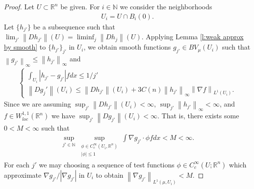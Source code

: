 \documentclass[12pt]{amsart}
\numberwithin{equation}{section}
\theoremstyle{plain}
\theoremstyle{definition}
\newcommand{\norm}[1]{\left\lVert#1\right\rVert}
\newcommand{\dist}{\mathop\mathrm{dist}\nolimits}
\begin{document}
\begin{proof}
    Let $U \subset \mathbb{R}^n$ be given.  For $i \in \mathbb{N}$ we consider the neighborhoods
    \begin{align*}
        U_i = U \cap B_i(0).
    \end{align*}
Let $\{h_{j'}\}$ be a subsequence such that $\lim_{j'}\norm{Dh_{j'}}(U) = \liminf_j \norm{Dh_j}(U)$.  Applying Lemma \ref{l:weak approx by smooth} to $\{h_{j'}\}_{j'}$ in $U_i$, we obtain smooth functions $g_{j'} \in BV_{\mu}(U_i)$ such that $\norm{g_{j'}}_{\infty} \le \norm{h_{j'}}_{\infty}$ and 
\begin{align}\label{e:smooth approx and strong convergence}
    \begin{cases}
\int_{U_i}|h_{j'} - g_{j'}|fdx \le 1/j'\\
\norm{Dg_j'}(U_i) \le \norm{Dh_{j'}}(U_i) + 3C(n)\norm{h_{j'}}_{\infty}\norm{\nabla f}_{L^1(U_i)}.
    \end{cases}
\end{align}
Since we are assuming $\sup_{j'}\norm{Dh_{j'}}(U_i)<\infty$, $\sup_{j'} \norm{h_{j'}}_{\infty}<\infty$, and $f \in W^{1,1}_{loc}(\mathbb{R}^n)$ we have $\sup_{j'} \norm{Dg_{j'}}(U_i)< \infty$.  That is, there exists some $0 < M <\infty$ such that \begin{align*}
    \sup_{j' \in \mathbb{N}} \sup_{\substack{\phi \in C^\infty_c(U_i, \mathbb{R}^n)\\|\phi|\le 1}} \int \nabla g_{j'} \cdot \phi fdx < M <\infty.
\end{align*}
For each $j'$ we may choosing a sequence of test functions $\phi \in C^\infty_c(U; \mathbb{R}^n)$ which approximate $\nabla g_{j'}/ |\nabla g_{j'}|$ in $U_i$ to obtain $\norm{\nabla g_{j'}}_{L^1(\mu, U_i)}< M$.

\end{proof}
\end{document}
